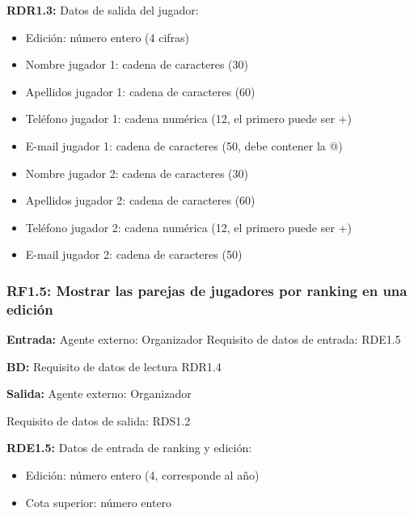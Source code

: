 \textbf{RDR1.3:} Datos de salida del jugador:
\begin{itemize}
	\item Edición: número entero (4 cifras)
\newline
	\item Nombre jugador 1: cadena de caracteres (30)
	\item Apellidos jugador 1: cadena de caracteres (60)
	\item Teléfono jugador 1: cadena numérica (12, el primero puede ser +)
	\item E-mail jugador 1: cadena de caracteres (50, debe contener la @)
\newline
	\item Nombre jugador 2: cadena de caracteres (30)
	\item Apellidos jugador 2: cadena de caracteres (60)
	\item Teléfono jugador 2: cadena numérica (12, el primero puede ser  +)
	\item E-mail jugador 2: cadena de caracteres (50)
\end{itemize}


\subsubsection{RF1.5: Mostrar las parejas de jugadores por ranking en una edición}

\textbf{Entrada:} Agente externo: Organizador        Requisito de datos de entrada: RDE1.5

\textbf{BD:} Requisito de datos de lectura RDR1.4

\textbf{Salida:} Agente externo: Organizador

Requisito de datos de salida: RDS1.2

\textbf{RDE1.5:} Datos de entrada de ranking y edición:
\begin{itemize}
	\item Edición: número entero (4, corresponde al año)
	\item Cota superior: número entero
\end{itemize}

